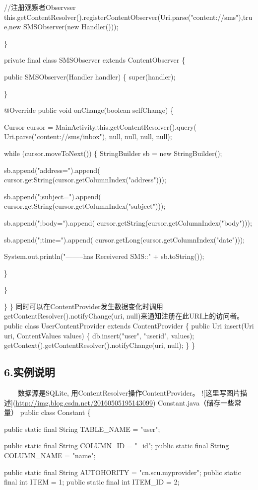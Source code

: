 \documentclass[9pt, b5paper]{article}
\begin{document}
//注册观察者Observser    
this.getContentResolver().registerContentObserver(Uri.parse("content://sms"),true,new SMSObserver(new Handler()));

\}

private final class SMSObserver extends ContentObserver \{

public SMSObserver(Handler handler) \{
    super(handler);

\}


@Override
public void onChange(boolean selfChange) \{

 Cursor cursor = MainActivity.this.getContentResolver().query(
Uri.parse("content://sms/inbox"), null, null, null, null);

while (cursor.moveToNext()) \{
    StringBuilder sb = new StringBuilder();

sb.append("address=").append(
        cursor.getString(cursor.getColumnIndex("address")));

sb.append(";subject=").append(
        cursor.getString(cursor.getColumnIndex("subject")));

sb.append(";body=").append(
        cursor.getString(cursor.getColumnIndex("body")));

sb.append(";time=").append(
        cursor.getLong(cursor.getColumnIndex("date")));

System.out.println("--------has Receivered SMS::" + sb.toString());


\}

\}

    \}
\}
  同时可以在ContentProvider发生数据变化时调用
getContentResolver().notifyChange(uri, null)来通知注册在此URI上的访问者。
 public class UserContentProvider extends ContentProvider \{
   public Uri insert(Uri uri, ContentValues values) \{
      db.insert("user", "userid", values);
      getContext().getContentResolver().notifyChange(uri, null);
   \}
\}
\subsection{6.实例说明}
\label{sec-14-6}
 　　数据源是SQLite, 用ContentResolver操作ContentProvider。
![这里写图片描述](\url{http://img.blog.csdn.net/20160505195143099})
Constant.java（储存一些常量）
public class Constant \{  

public static final String TABLE\_NAME = "user";  

public static final String COLUMN\_ID = "\_id";  
public static final String COLUMN\_NAME = "name";  


public static final String AUTOHORITY = "cn.scu.myprovider";  
public static final int ITEM = 1;  
public static final int ITEM\_ID = 2;  
\end{document}
